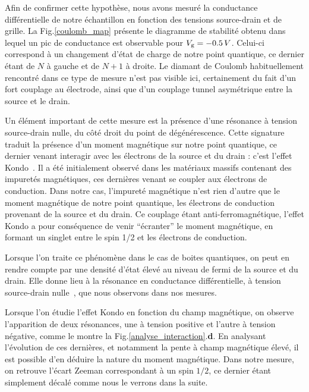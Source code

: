 Afin de confirmer cette hypothèse, nous avons mesuré la conductance différentielle de notre échantillon en fonction des tensions source-drain et de grille. La Fig.\ref{coulomb_map} présente le diagramme de stabilité obtenu dans lequel un pic de conductance est observable pour $V_{\rm{g}}=-0.5\,V$. Celui-ci correspond à un changement d'état de charge de notre point quantique, ce dernier étant de $N$ à gauche et de $N+1$ à droite. Le diamant de Coulomb habituellement rencontré dans ce type de mesure n'est pas visible ici, certainement du fait d'un fort couplage au électrode, ainsi que d'un couplage tunnel asymétrique entre la source et le drain.

Un élément important de cette mesure est la présence d'une résonance à tension source-drain nulle, du côté droit du point de dégénérescence. Cette signature traduit la présence d'un moment magnétique sur notre point quantique, ce dernier venant interagir avec les électrons de la source et du drain : c'est l'effet Kondo~\cite{Kondo1964,Wilson1975,Goldhaber-Gordon1998}.
 Il a été initialement observé dans les matériaux massifs contenant des impuretés magnétiques, ces dernières venant se coupler aux électrons de conduction. Dans notre cas, l'impureté magnétique n'est rien d'autre que le moment magnétique de notre point quantique, les électrons de conduction provenant de la source et du drain. Ce couplage étant anti-ferromagnétique, l'effet Kondo a pour conséquence de venir ``écranter'' le moment magnétique, en formant un singlet entre le spin 1/2 et les électrons de conduction.

Lorsque l'on traite ce phénomène dans le cas de boites quantiques, on peut en rendre compte par une densité d'état élevé au niveau de fermi de la source et du drain. Elle donne lieu à la résonance en conductance différentielle, à tension source-drain nulle~\cite{Goldhaber-Gordon1998}, que nous observons dans nos mesures.

Lorsque l'on étudie l'effet Kondo en fonction du champ magnétique, on observe l'apparition de deux résonances, une à tension positive et l'autre à tension négative, comme le montre la Fig.\ref{analyse_interaction}.\textbf{d}. En analysant l'évolution de ces dernières, et notamment la pente à champ magnétique élevé, il est possible d'en déduire la nature du moment magnétique. Dans notre mesure, on retrouve l'écart Zeeman correspondant à un spin $1/2$, ce dernier étant simplement décalé comme nous le verrons dans la suite.

